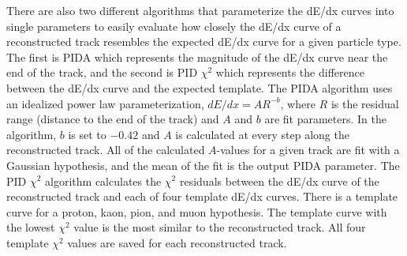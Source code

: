     There are also two different algorithms that parameterize the dE/dx curves
    into single parameters to easily evaluate how closely the dE/dx curve of a
    reconstructed track resembles the expected dE/dx curve for a given particle
    type. The first is PIDA which represents the magnitude of the dE/dx curve
    near the end of the track, and the second is PID $\chi^2$ which represents
    the difference between the dE/dx curve and the expected template. The PIDA
    algorithm uses an idealized power law parameterization, $dE/dx = AR^{-b}$,
    where $R$ is the residual range (distance to the end of the track) and $A$
    and $b$ are fit parameters. In the algorithm, $b$ is set to $-0.42$ and $A$
    is calculated at every step along the reconstructed track. All of the
    calculated $A$-values for a given track are fit with a Gaussian hypothesis,
    and the mean of the fit is the output PIDA parameter. The PID $\chi^2$
    algorithm calculates the $\chi^2$ residuals between the dE/dx curve of the
    reconstructed track and each of four template dE/dx curves. There is a
    template curve for a proton, kaon, pion, and muon hypothesis. The template
    curve with the lowest $\chi^2$ value is the most similar to the
    reconstructed track. All four template $\chi^2$ values are saved for each
    reconstructed track.


